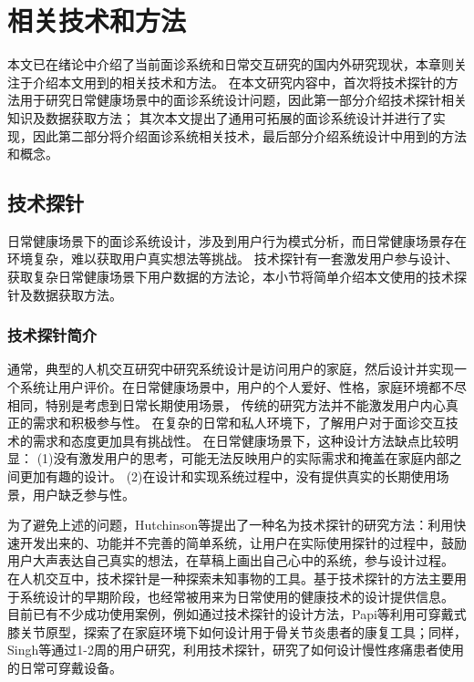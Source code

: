 \chapter{相关技术和方法}
本文已在绪论中介绍了当前面诊系统和日常交互研究的国内外研究现状，本章则关注于介绍本文用到的相关技术和方法。
在本文研究内容中，首次将技术探针的方法用于研究日常健康场景中的面诊系统设计问题，因此第一部分介绍技术探针相关知识及数据获取方法；
其次本文提出了通用可拓展的面诊系统设计并进行了实现，因此第二部分将介绍面诊系统相关技术，最后部分介绍系统设计中用到的方法和概念。

\section{技术探针}
日常健康场景下的面诊系统设计，涉及到用户行为模式分析，而日常健康场景存在环境复杂，难以获取用户真实想法等挑战。
技术探针有一套激发用户参与设计、获取复杂日常健康场景下用户数据的方法论，本小节将简单介绍本文使用的技术探针及数据获取方法。
\subsection{技术探针简介}

通常，典型的人机交互研究中研究系统设计是访问用户的家庭，然后设计并实现一个系统让用户评价。在日常健康场景中，用户的个人爱好、性格，家庭环境都不尽相同，特别是考虑到日常长期使用场景，
传统的研究方法并不能激发用户内心真正的需求和积极参与性。
在复杂的日常和私人环境下，了解用户对于面诊交互技术的需求和态度更加具有挑战性。
在日常健康场景下，这种设计方法缺点比较明显\cite{Hutchinson2003Technology}：
(1)没有激发用户的思考，可能无法反映用户的实际需求和掩盖在家庭内部之间更加有趣的设计。
(2)在设计和实现系统过程中，没有提供真实的长期使用场景，用户缺乏参与性。

为了避免上述的问题，Hutchinson等\cite{Hutchinson2003Technology}提出了一种名为技术探针的研究方法：利用快速开发出来的、功能并不完善的简单系统，让用户在实际使用探针的过程中，鼓励用户大声表达自己真实的想法，在草稿上画出自己心中的系统，参与设计过程。
在人机交互中，技术探针是一种探索未知事物的工具。基于技术探针的方法主要用于系统设计的早期阶段\cite{turmo2020training}，也经常被用来为日常使用的健康技术的设计提供信息。
目前已有不少成功使用案例，例如通过技术探针的设计方法，Papi等\cite{papi2015knee}利用可穿戴式膝关节原型，探索了在家庭环境下如何设计用于骨关节炎患者的康复工具；同样，Singh等\cite{singh2017supporting}通过1-2周的用户研究，利用技术探针，研究了如何设计慢性疼痛患者使用的日常可穿戴设备。

